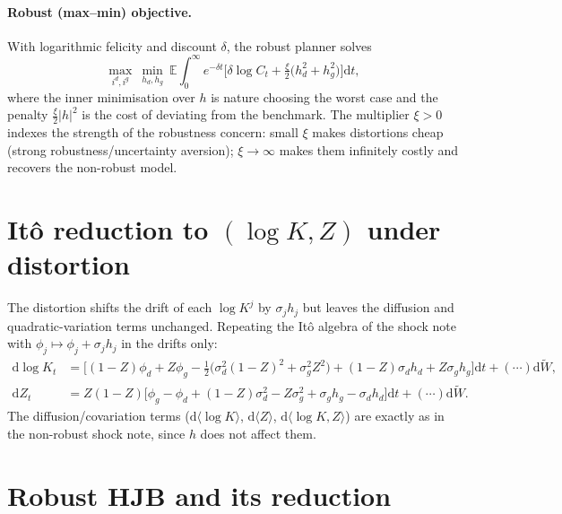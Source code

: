 \documentclass[11pt]{article}
\newcommand{\dd}{\mathrm{d}}
\newcommand{\xicap}{\xi}
\begin{document}
\paragraph{Robust (max--min) objective.} With logarithmic felicity and discount
$\delta$, the robust planner solves
\[
\max_{i^d,i^g}\ \min_{h_d,h_g}\
\mathbb E\!\int_0^\infty e^{-\delta t}\Big[\delta\log C_t
+\tfrac{\xicap}{2}\big(h_d^2+h_g^2\big)\Big]\dd t,
\]
where the inner minimisation over $h$ is nature choosing the worst case and the
penalty $\tfrac{\xicap}{2}|h|^2$ is the cost of deviating from the benchmark. The
multiplier $\xicap>0$ indexes the strength of the robustness concern: small $\xicap$
makes distortions cheap (strong robustness/uncertainty aversion); $\xicap\to\infty$
makes them infinitely costly and recovers the non-robust model.

\section{It\^o reduction to $(\log K,Z)$ under distortion}

The distortion shifts the drift of each $\log K^j$ by $\sigma_j h_j$ but leaves the
diffusion and quadratic-variation terms unchanged. Repeating the It\^o algebra of the
shock note with $\phi_j\mapsto\phi_j+\sigma_j h_j$ in the drifts only:
\begin{align*}
\dd\log K_t&=\Big[(1-Z)\phi_d+Z\phi_g-\tfrac12\big(\sigma_d^2(1-Z)^2+\sigma_g^2Z^2\big)
+(1-Z)\sigma_d h_d+Z\sigma_g h_g\Big]\dd t+(\cdots)\dd\widetilde W,\\
\dd Z_t&=Z(1-Z)\Big[\phi_g-\phi_d+(1-Z)\sigma_d^2-Z\sigma_g^2
+\sigma_g h_g-\sigma_d h_d\Big]\dd t+(\cdots)\dd\widetilde W .
\end{align*}
The diffusion/covariation terms ($\dd\langle\log K\rangle$, $\dd\langle Z\rangle$,
$\dd\langle\log K,Z\rangle$) are exactly as in the non-robust shock note, since $h$
does not affect them.

\section{Robust HJB and its reduction}
\end{document}
